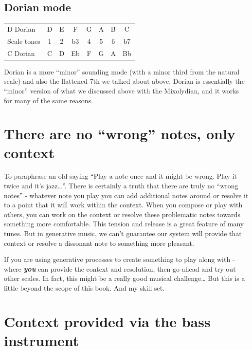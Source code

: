 \documentclass[
  12pt,
  letterpaper,
  oneside,
  open=any]{scrbook}
\begin{document}
\subsection{Dorian mode}\label{dorian-mode}

\begin{longtable}[]{@{}lccccccc@{}}
\toprule\noalign{}
\endhead
\bottomrule\noalign{}
\endlastfoot
D Dorian & D & E & F & G & A & B & C \\
Scale tones & 1 & 2 & b3 & 4 & 5 & 6 & b7 \\
C Dorian & C & D & Eb & F & G & A & Bb \\
\end{longtable}

Dorian is a more ``minor'' sounding mode (with a minor third from the
natural scale) and also the flattened 7th we talked about above. Dorian
is essentially the ``minor'' version of what we discussed above with the
Mixolydian, and it works for many of the same reasons.

\section{There are no ``wrong'' notes, only
context}\label{there-are-no-wrong-notes-only-context}

To paraphrase an old saying ``Play a note once and it might be wrong.
Play it twice and it's jazz\ldots{}''. There is certainly a truth that
there are truly no ``wrong notes'' - whatever note you play you can add
additional notes around or resolve it to a point that it will work
within the context. When you compose or play with others, you can work
on the context or resolve these problematic notes towards something more
comfortable. This tension and release is a great feature of many tunes.
But in generative music, we can't guarantee our system will provide that
context or resolve a dissonant note to something more pleasant.

If you are using generative processes to create something to play along
with - where \textbf{\emph{you}} can provide the context and resolution,
then go ahead and try out other scales. In fact, this might be a really
good musical challenge\ldots{} But this is a little beyond the scope of
this book. And my skill set.

\section{Context provided via the bass
instrument}\label{context-provided-via-the-bass-instrument}
\end{document}

